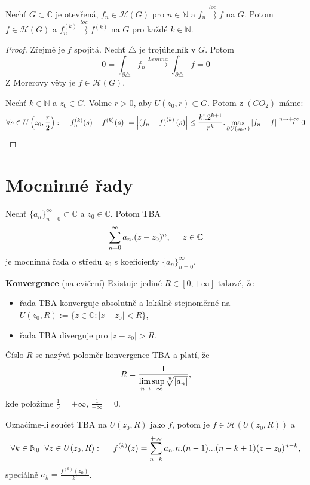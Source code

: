 \begin{theorem}[Weierstrass]
Nechť $G\subset{\mathbb{C}}$ je otevřená, $f_n\in\mathcal{H}(G)$ pro $n\in\mathbb{N}$ a $f_n\overset{loc}{\rightrightarrows}f$ na $G$. Potom $f\in\mathcal{H}(G)$ a $f_n^{(k)}\overset{loc}{\rightrightarrows}f^{(k)}$ na $G$ pro každé $k\in\mathbb{N}$.
\end{theorem}

\begin{proof}
 Zřejmě je $f$ spojitá. Nechť $\triangle$ je trojúhelník v $G$. Potom 
\[0=\int_{\partial\triangle}{f_n}\overset{Lemma}{\longrightarrow}
\int_{\partial\triangle}{f}=0\]
Z Morerovy věty je $f\in\mathcal{H}(G)$.

 Nechť $k\in\mathbb{N}$ a $z_0\in{G}$. Volme $r>0$, aby $\overline{U(z_0,r)}\subset{G}$. Potom z $(CO_2)$ máme:
\[\forall{s\in{U\left(z_0,\frac{r}{2}\right)}}:\hspace{3mm}
{\left\lvert{f_n^{(k)}(s)-f^{(k)}(s)}\right\lvert}=
\left\lvert{\left({f_n-f}\right)^{(k)}(s)}\right\lvert\leq
\frac{k!.2^{k+1}}{r^k}.\max_{\partial{U(z_0,r)}}{|f_n-f|}
\overset{n\to+\infty}{\longrightarrow}0\]
\end{proof}

\section{\texorpdfstring{Mocninné řady}{Mocninné řady}}

\begin{definition}
Nechť $\{a_n\}_{n=0}^\infty\subset\mathbb{C}$ a $z_0\in\mathbb{C}$. Potom TBA
\[\sum_{n=0}^\infty{a_n.(z-z_0)^n}, \hspace{5mm} z\in\mathbb{C}\]
je mocninná řada o středu $z_0$ s koeficienty $\{a_n\}_{n=0}^\infty$.
\end{definition}

\begin{properties}
 \textbf{Konvergence} (na cvičení) \newline
Existuje jediné $R\in{[0,+\infty]}$ takové, že 
\begin{itemize}
    \item řada TBA konverguje absolutně a lokálně stejnoměrně na  $U(z_0,R):=\{z\in\mathbb{C} : |z-z_0|<R\}$, 
    \item řada TBA diverguje pro $|z-z_0|>R$. 
\end{itemize}
Číslo $R$ se nazývá poloměr konvergence TBA a platí, že
\[R=\frac{1}{
\underset{n\to+\infty}{\limsup}{\sqrt[\leftroot{-3}\uproot{3}n]{|a_n|}}},\]
kde položíme $\frac{1}{0}=+\infty$, $\frac{1}{+\infty}=0$.

 Označíme-li součet TBA na $U(z_0,R)$ jako $f$, potom je $f\in\mathcal{H}(U(z_0,R))$ a 
\[
\forall{k\in\mathbb{N}_0}\hspace{2mm}\forall{z\in{U(z_0,R)}}: \hspace{5mm}
f^{(k)}(z)=
\sum_{n=k}^{+\infty}{a_n.n.(n-1)...(n-k+1)(z-z_0)^{n-k}},\]
speciálně $a_k=\frac{f^{(k)}(z_0)}{k!}$.
\end{properties}

